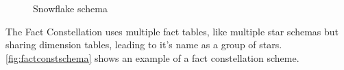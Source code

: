 \begin{figure}[!htb]
  \caption{Snowflake schema}\label{fig:snowflakeschema}
  \vspace{2mm}
  \begin{center}
  \end{center}
  \vspace{1mm}
  \legenda{}
\end{figure}

The Fact Constellation uses multiple fact tables, like multiple star schemas but sharing dimension tables, leading to it's name as a group of stars.
\autoref{fig:factconstschema} shows an example of a fact constellation scheme.

